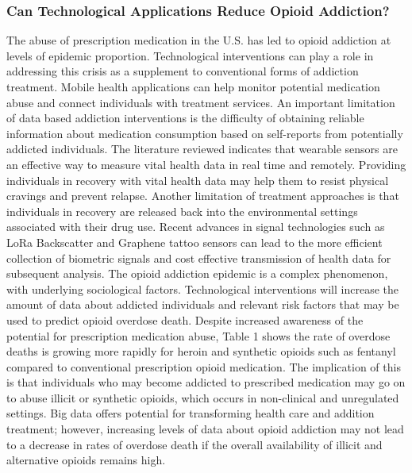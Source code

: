\documentclass[sigconf]{acmart}
\begin{document}
\subsubsection{Can Technological Applications Reduce Opioid Addiction?}
The abuse of prescription medication in the U.S. has led to opioid addiction  
at levels of epidemic proportion. Technological interventions can play a role 
in addressing this crisis as a supplement to conventional forms of addiction 
treatment. Mobile health applications can help monitor potential medication 
abuse and connect individuals with treatment services. An important limitation 
of data based addiction interventions is the difficulty of obtaining reliable 
information about medication consumption based on self-reports from potentially 
addicted individuals. The literature reviewed indicates that wearable sensors 
are an effective way to measure vital health data in real time and remotely. 
Providing individuals in recovery with vital health data may help them to 
resist physical cravings and prevent relapse. Another limitation of treatment 
approaches is that individuals in recovery are released back into the 
environmental settings associated with their drug use. Recent advances in 
signal technologies such as LoRa Backscatter and Graphene tattoo sensors can 
lead to the more efficient collection of biometric signals and cost effective 
transmission of health data for subsequent analysis. The opioid addiction 
epidemic is a complex phenomenon, with underlying sociological factors. 
Technological interventions will increase the amount of data about addicted
individuals and relevant risk factors that may be used to predict opioid 
overdose death. Despite increased awareness of the potential for prescription 
medication abuse, Table 1 shows the rate of overdose deaths is growing more 
rapidly for heroin and synthetic opioids such as fentanyl compared to 
conventional prescription opioid medication. The implication of this is that 
individuals who may become addicted to prescribed medication may go on to 
abuse illicit or synthetic opioids, which occurs in non-clinical and 
unregulated settings. Big data offers potential for transforming health care
and addition treatment; however, increasing levels of data about opioid 
addiction may not lead to a decrease in rates of overdose death if the 
overall availability of illicit and alternative opioids remains high. 


\end{document}
